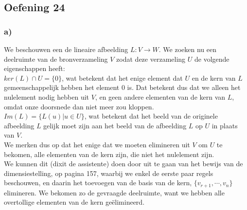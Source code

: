 \documentclass[lineaire_algebra_oplossingen.tex]{subfiles}
\begin{document}
\subsection{Oefening 24}
\subsubsection*{a)}
We beschouwen een de lineaire afbeelding $L:V\rightarrow W$. We zoeken nu een deelruimte van de bronverzameling $V$ zodat deze verzameling $U$ de volgende eigenschappen heeft:\\
$ker(L)\cap U = \{0\}$, wat betekent dat het enige element dat $U$ en de kern van $L$ gemeenschappelijk hebben het element $0$ is. Dat betekent dus dat we alleen het nulelement nodig hebben uit $V$, en geen andere elementen van de kern van $L$, omdat onze doorsnede dan niet meer zou kloppen.\\
$Im(L) = \{L(u)| u\in U\}$, wat betekent dat het beeld van de originele afbeelding $L$ gelijk moet zijn aan het beeld van de afbeelding $L$ op $U$ in plaats van $V$.\\
We merken dus op dat het enige dat we moeten elimineren uit $V$ om $U$ te bekomen, alle elementen van de kern zijn, die niet het nulelement zijn.\\
We kunnen dit (dixit de assistente) doen door uit te gaan van het bewijs van de dimensiestelling, op pagina 157, waarbij we enkel de eerste paar regels beschouwen, en daarin het toevoegen van de basis van de kern, $\{v_{r+1},\cdots,v_n\}$ elimineren. We bekomen zo de gevraagde deelruimte, want we hebben alle overtollige elementen van de kern ge\"elimineerd.
\end{document}
